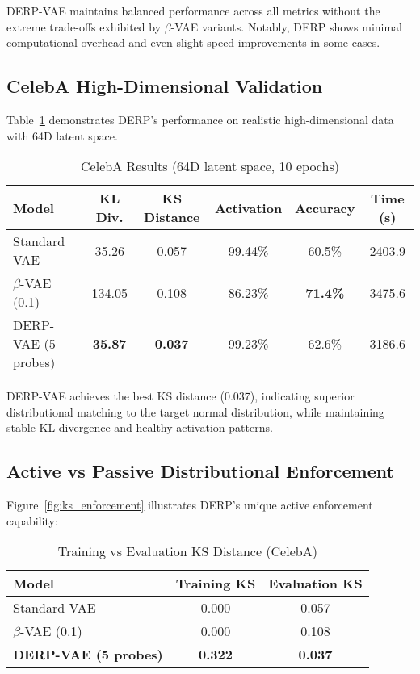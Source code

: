 \documentclass[11pt]{article}
\begin{document}
DERP-VAE maintains balanced performance across all metrics without the extreme trade-offs exhibited by $\beta$-VAE variants. Notably, DERP shows minimal computational overhead and even slight speed improvements in some cases.

\subsection{CelebA High-Dimensional Validation}

Table~\ref{tab:celeba_results} demonstrates DERP's performance on realistic high-dimensional data with 64D latent space.

\begin{table}[ht]
\centering
\caption{CelebA Results (64D latent space, 10 epochs)}
\label{tab:celeba_results}
\begin{tabular}{@{}lccccc@{}}
\toprule
\textbf{Model} & \textbf{KL Div.} & \textbf{KS Distance} & \textbf{Activation} & \textbf{Accuracy} & \textbf{Time (s)} \\
\midrule
Standard VAE & 35.26 & 0.057 & 99.44\% & 60.5\% & 2403.9 \\
$\beta$-VAE (0.1) & 134.05 & 0.108 & 86.23\% & \textbf{71.4\%} & 3475.6 \\
DERP-VAE (5 probes) & \textbf{35.87} & \textbf{0.037} & 99.23\% & 62.6\% & 3186.6 \\
\bottomrule
\end{tabular}
\end{table}

DERP-VAE achieves the best KS distance (0.037), indicating superior distributional matching to the target normal distribution, while maintaining stable KL divergence and healthy activation patterns.

\subsection{Active vs Passive Distributional Enforcement}

Figure~\ref{fig:ks_enforcement} illustrates DERP's unique active enforcement capability:

\begin{table}[ht]
\centering
\caption{Training vs Evaluation KS Distance (CelebA)}
\label{tab:ks_enforcement}
\begin{tabular}{@{}lcc@{}}
\toprule
\textbf{Model} & \textbf{Training KS} & \textbf{Evaluation KS} \\
\midrule
Standard VAE & 0.000 & 0.057 \\
$\beta$-VAE (0.1) & 0.000 & 0.108 \\
\textbf{DERP-VAE (5 probes)} & \textbf{0.322} & \textbf{0.037} \\
\bottomrule
\end{tabular}
\end{table}
\end{document}
